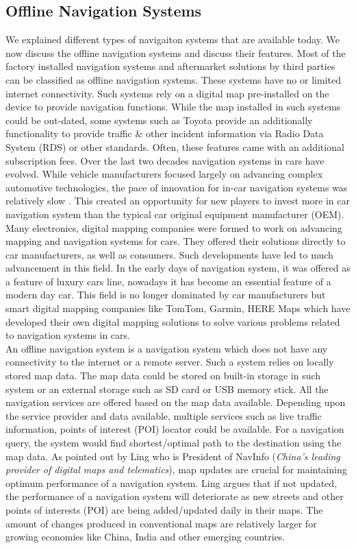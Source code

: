 \subsection{Offline Navigation Systems} \label{offlinenav}
We explained different types of navigaiton systems that are available today. We now discuss the offline navigation systems and discuss their features. Most of the factory installed navigation systems and aftermarket solutions by third parties can be classified as offline navigation systems. These systems have no or limited internet connectivity. Such systems rely on a digital map pre-installed on the device to provide navigation functions. While the map installed in such systems could be out-dated, some systems such as Toyota \citep{ishikawa1991map} provide an additionally functionality to provide traffic \& other incident information via Radio Data System (RDS) or other standards. Often, these features came with an additional subscription fees. Over the last two decades navigation systems in cars have evolved. While vehicle manufacturers focused largely on advancing complex automotive technologies, the pace of innovation for in-car navigation systems was relatively slow \cite{schaminee2011short}. This created an opportunity for new players to invest more in car navigation system than the typical car original equipment manufacturer (OEM). Many electronics, digital mapping companies were formed to work on advancing mapping and navigation systems for cars. They offered their solutions directly to car manufacturers, as well as consumers. Such developments have led to much advancement in this field. In the early days of navigation system, it was offered as a feature of luxury cars line, nowadays it has become an essential feature of a modern day car. This field is no longer dominated by car manufacturers but smart digital mapping companies like TomTom, Garmin, HERE Maps which have developed their own digital mapping solutions to solve various problems related to navigation systems in cars.\\

An offline navigation system is a navigation system which does not have any connectivity to the internet or a remote server. Such a system relies on locally stored map data. The map data could be stored on built-in storage in such system or an external storage such as SD card or USB memory stick. All the navigation services are offered based on the map data available. Depending upon the service provider and data available, multiple services such as live traffic information, points of interest (POI) locator could be available. For a navigation query, the system would find shortest/optimal path to the destination using the map data. As pointed out by Ling \cite{navinfo} who is President of NavInfo (\textit{China's leading provider of digital maps and telematics}), map updates are crucial for maintaining optimum performance of a navigation system. Ling argues that if not updated, the performance of a navigation system will deteriorate as new streets and other points of interests (POI) are being added/updated daily in their maps. The amount of changes produced in conventional maps are relatively larger for growing economies like China, India and other emerging countries. \\

